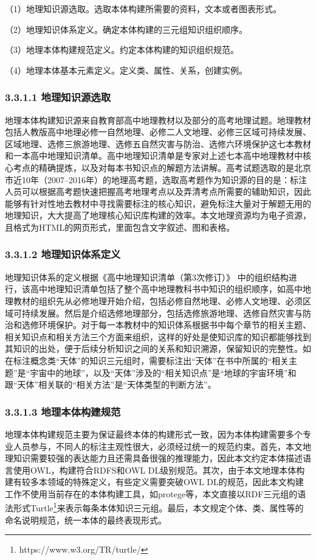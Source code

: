 （1）地理知识源选取。选取本体构建所需要的资料，文本或者图表形式。

（2）地理知识体系定义。确定本体构建的三元组知识组织顺序。

（3）地理本体构建规范定义。约定本体构建的知识组织规范。

（4）地理本体基本元素定义。定义类、属性、关系，创建实例。

\subsubsection{3.3.1.1 地理知识源选取}
地理本体构建知识源来自教育部高中地理教材以及部分的高考地理试题。地理教材包括人教版高中地理必修一自然地理、必修二人文地理、必修三区域可持续发展、区域地理、选修三旅游地理、选修五自然灾害与防治、选修六环境保护这七本教材和一本高中地理知识清单。高中地理知识清单是专家对上述七本高中地理教材中核心考点的精确提炼，以及对每本书知识点的解题方法讲解。高考试题选取的是北京市近10年（2007--2016年）的地理高考题，选取高考题作为知识源的目的是：标注人员可以根据高考题快速把握高考地理考点以及弄清考点所需要的辅助知识，因此能够有针对性地去教材中寻找需要标注的核心知识，避免标注大量对于解题无用的地理知识，大大提高了地理核心知识库构建的效率。本文地理资源均为电子资源，且格式为HTML的网页形式，里面包含文字叙述、图和表格。

\subsubsection{3.3.1.2 地理知识体系定义}
地理知识体系的定义根据《高中地理知识清单（第3次修订）》
中的组织结构进行，该高中地理知识清单包括了整个高中地理教科书中知识的组织顺序，如高中地理教材的组织先从必修地理开始介绍，包括必修自然地理、必修人文地理、必须区域可持续发展。然后是介绍选修地理部分，包括选修旅游地理、选修自然灾害与防治和选修环境保护。对于每一本教材中的知识体系根据书中每个章节的相关主题、相关知识点和相关方法三个方面来组织，这样的好处是使知识库的知识都能够找到其知识的出处，便于后续分析知识之间的关系和知识溯源，保留知识的完整性。如在标注概念类“天体”的知识三元组时，需要标注出“天体”在书中所属的“相关主题”是“宇宙中的地球”，以及“天体”涉及的“相关知识点”是“地球的宇宙环境”和跟“天体”相关联的“相关方法”是“天体类型的判断方法”。

\subsubsection{3.3.1.3 地理本体构建规范}
地理本体构建规范主要为保证最终本体的构建形式一致，因为本体构建需要多个专业人员参与，不同人的标注主观性很大，必须经过统一的规范约束。首先，本文地理知识需要较强的表达能力且还需具备很强的推理能力，因此本文约定本体描述语言使用OWL，构建符合RDFS和OWL DL级别规范。其次，由于本文地理本体构建有较多本领域的特殊定义，有些定义需要突破OWL DL的规范，因此本文构建工作不使用当前存在的本体构建工具，如protege等，本文直接以RDF三元组的语法形式Turtle\footnote{https://www.w3.org/TR/turtle/}来表示每条本体知识三元组。最后，本文规定个体、类、属性等的命名说明规范，统一本体的最终表现形式。

